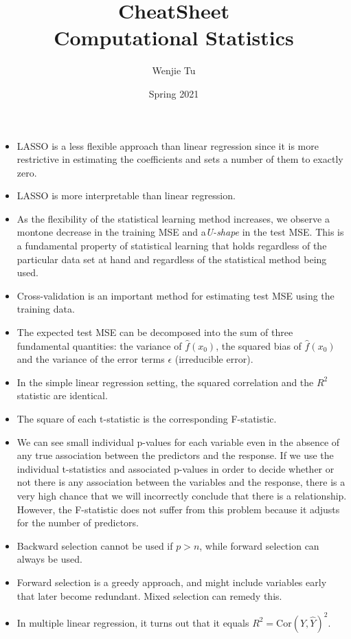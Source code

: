 \documentclass{article}
\title{%
    CheatSheet \\
    \large Computational Statistics
}
\author{Wenjie Tu}
\date{Spring 2021}
\begin{document}
\maketitle

\begin{itemize}
    \item LASSO is a less flexible approach than linear regression since it is more restrictive in estimating the coefficients and sets a number of them to exactly zero.
    \item LASSO is more interpretable than linear regression.
    \item As the flexibility of the statistical learning method increases, we observe a montone decrease in the training MSE and a\textit{U-shape} in the test MSE. This is a fundamental property of statistical learning that holds regardless of the particular data set at hand and regardless of the statistical method being used.
    \item Cross-validation is an important method for estimating test MSE using the training data.
    \item The expected test MSE can be decomposed into the sum of three fundamental quantities: the variance of $\hat{f}(x_0)$, the squared bias of $\hat{f}(x_0)$ and the variance of the error terms $\epsilon$ (irreducible error).
    \item In the simple linear regression setting, the squared correlation and the $R^2$ statistic are identical.
    \item The square of each t-statistic is the corresponding F-statistic.
    \item We can see small individual p-values for each variable even in the absence of any true association between the predictors and the response. If we use the individual t-statistics and associated p-values in order to decide whether or not there is any association between the variables and the response, there is a very high chance that we will incorrectly conclude that there is a relationship. However, the F-statistic does not suffer from this problem because it adjusts for the number of predictors.
    \item Backward selection cannot be used if $p>n$, while forward selection can always be used.
    \item Forward selection is a greedy approach, and might include variables early that later become redundant. Mixed selection can remedy this.
    \item In multiple linear regression, it turns out that it equals $R^2=\textrm{Cor}(Y,\hat{Y})^2$.

\end{itemize}
\end{document}
